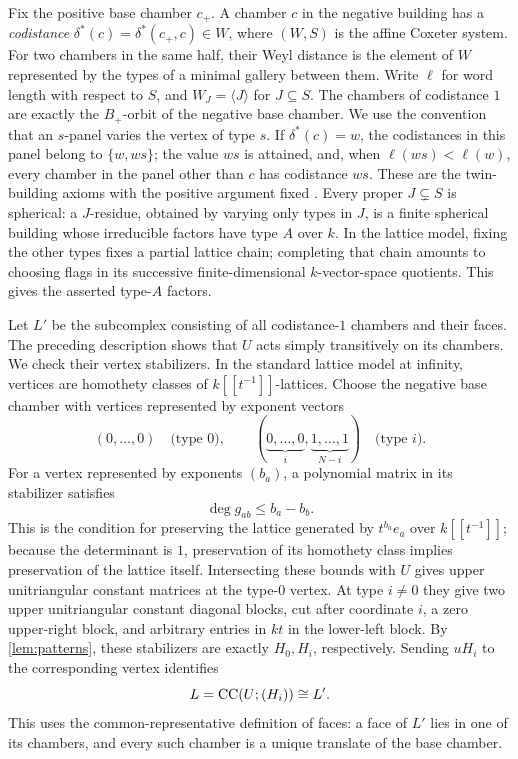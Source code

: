 Fix the positive base chamber $c_+$. A chamber $c$ in the negative
building has a \emph{codistance} $\delta^*(c)=\delta^*(c_+,c)\in W$,
where $(W,S)$ is the affine Coxeter system. For two chambers in the same
half, their Weyl distance is the element of $W$ represented by the types
of a minimal gallery between them. Write $\ell$ for word length with respect to $S$, and
$W_J=\langle J\rangle$ for $J\subseteq S$.
The chambers of codistance $1$ are exactly the
$B_+$-orbit of the negative base chamber. We use the convention that an
$s$-panel varies the vertex of type $s$. If $\delta^*(c)=w$, the
codistances in this panel belong to $\{w,ws\}$; the value $ws$ is attained,
and, when $\ell(ws)<\ell(w)$, every chamber in the panel other than $c$
has codistance $ws$. These are the twin-building axioms with the positive
argument fixed \cite[Definition~1.1]{AVM2001}.
Every proper $J\subsetneq S$ is spherical:
a $J$-residue, obtained by varying only types in $J$, is a finite spherical
building whose irreducible factors have type $A$ over $k$. In the lattice
model, fixing the other types fixes a partial lattice chain; completing
that chain amounts to choosing flags in its successive finite-dimensional
$k$-vector-space quotients. This gives the asserted type-$A$ factors.

Let $L'$ be the subcomplex consisting of all codistance-$1$ chambers and
their faces. The preceding description shows that $U$ acts simply
transitively on its chambers. We check their vertex stabilizers.
In the standard lattice model at infinity, vertices are homothety classes
of $k[[t^{-1}]]$-lattices. Choose the negative base chamber with vertices
represented by exponent vectors
\[
 (0,\ldots,0)\quad\text{(type $0$)},\qquad
 (\underbrace{0,\ldots,0}_{i},\underbrace{1,\ldots,1}_{N-i})
 \quad\text{(type $i$)}.
\]
For a vertex represented by exponents $(b_a)$, a polynomial matrix in
its stabilizer satisfies
\begin{equation}\label{eq:lattice-bounds}
 \deg g_{ab}\le b_a-b_b.
\end{equation}
This is the condition for preserving the lattice generated by $t^{b_a}e_a$
over $k[[t^{-1}]]$; because the determinant is $1$, preservation of its
homothety class implies preservation of the lattice itself. Intersecting
these bounds with $U$ gives upper unitriangular constant matrices at the
type-$0$ vertex. At type
$i\ne0$ they give two upper unitriangular constant diagonal blocks, cut
after coordinate $i$, a zero upper-right block, and arbitrary entries
in $kt$ in the lower-left block. By \cref{lem:patterns}, these stabilizers
are exactly $H_0,H_i$, respectively. Sending $uH_i$ to the corresponding
vertex identifies
\begin{equation}\label{eq:L-opposite}
 L=\operatorname{CC}(U;(H_i))\cong L'.
\end{equation}
This uses the common-representative definition of faces: a face of $L'$
lies in one of its chambers, and every such chamber is a unique translate
of the base chamber.

